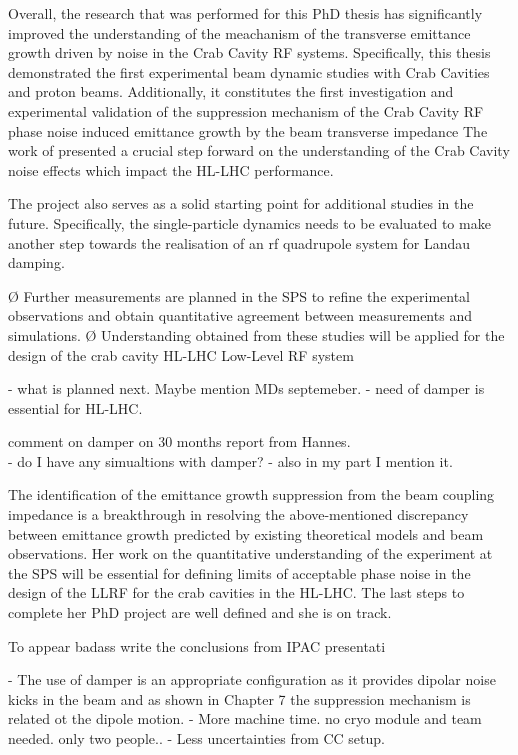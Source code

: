 Overall, the research that was performed for this PhD thesis has significantly improved the understanding of the meachanism of the transverse emittance growth driven by noise in the Crab Cavity RF systems. Specifically, this thesis demonstrated the first experimental beam dynamic studies with Crab Cavities and proton beams. Additionally, it constitutes the first investigation and experimental validation of the suppression mechanism of the Crab
Cavity RF phase noise induced emittance growth by the beam transverse impedance The work of presented a crucial step forward on the understanding of the Crab Cavity noise effects which impact the HL-LHC performance.


The project also serves as a solid starting point for additional studies in the future.
Specifically, the single-particle dynamics needs to be evaluated to make another step towards the
realisation of an rf quadrupole system for Landau damping.

Ø Further measurements are planned in the SPS to refine the experimental observations and
obtain quantitative agreement between measurements and simulations.
Ø Understanding obtained from these studies will be applied for the design of the crab cavity HL-LHC Low-Level RF system


- what is planned next. Maybe mention MDs septemeber. 
- need of damper is essential for HL-LHC.

comment on damper on 30 months report from Hannes.\\
- do I have any simualtions with damper?
- also in my part I mention it.

The identification of the emittance growth suppression from the beam coupling impedance is a breakthrough in resolving the above-mentioned discrepancy between emittance growth predicted by existing theoretical models and beam observations. Her work on the quantitative understanding of the experiment at the SPS will be essential for defining limits of acceptable phase noise in the design of the LLRF for the crab cavities in the HL-LHC. The last steps to complete her PhD project are well defined and she is on track.








To appear badass write the conclusions from IPAC presentati


\newpage
- The use of damper is an appropriate configuration as it provides dipolar noise kicks in the beam and as shown in Chapter 7 the suppression mechanism is related ot the dipole motion. 
- More machine time. no cryo module and team needed. only two people..
- Less uncertainties from CC setup.




